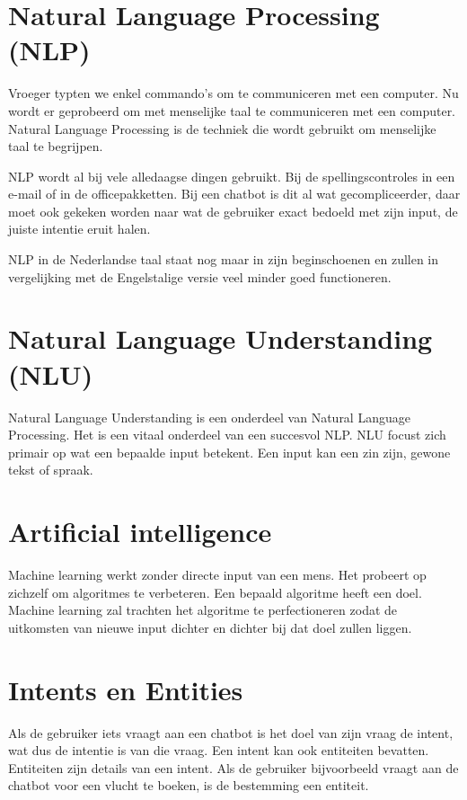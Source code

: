 \section{Natural Language Processing (NLP)}
\label{sec:Natural Language Processing}

Vroeger typten we enkel commando's om te communiceren met een computer. Nu wordt er geprobeerd om met menselijke taal te communiceren met een computer. Natural Language Processing is de techniek die wordt gebruikt om menselijke taal te begrijpen.

NLP wordt al bij vele alledaagse dingen gebruikt. Bij de spellingscontroles in een e-mail of in de officepakketten. Bij een chatbot is dit al wat gecompliceerder, daar moet ook gekeken worden naar wat de gebruiker exact bedoeld met zijn input, de juiste intentie eruit halen.

NLP in de Nederlandse taal staat nog maar in zijn beginschoenen en zullen in vergelijking met de Engelstalige versie veel minder goed functioneren. ~\autocite{Dave2018}

\section{Natural Language Understanding (NLU)}
\label{sec:Natural Language Understanding}

Natural Language Understanding is een onderdeel van Natural Language Processing. Het is een vitaal onderdeel van een succesvol NLP. NLU focust zich primair op wat een bepaalde input betekent. Een input kan een zin zijn, gewone tekst of spraak. ~\autocite{Margaret2018}

\section{Artificial intelligence}
\label{sec:Artificial intelligence}

Machine learning werkt zonder directe input van een mens. Het probeert op zichzelf om algoritmes te verbeteren. Een bepaald algoritme heeft een doel. Machine learning zal trachten het algoritme te perfectioneren zodat de uitkomsten van nieuwe input dichter en dichter bij dat doel zullen liggen.

\section{Intents en Entities}
\label{sec:IntentsEntiteiten}

Als de gebruiker iets vraagt aan een chatbot is het doel van zijn vraag de intent, wat dus de intentie is van die vraag. Een intent kan ook entiteiten bevatten. Entiteiten zijn details van een intent. Als de gebruiker bijvoorbeeld vraagt aan de chatbot voor een vlucht te boeken, is de bestemming een entiteit.

